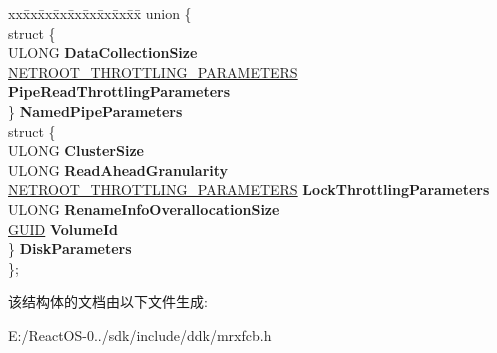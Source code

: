 \begin{DoxyCompactItemize}
\begin{tabbing}
xx\=xx\=xx\=xx\=xx\=xx\=xx\=xx\=xx\=\kill
union \{\\
\>struct \{\\
\>\>ULONG {\bfseries DataCollectionSize}\\
\>\>\hyperlink{struct___n_e_t_r_o_o_t___t_h_r_o_t_t_l_i_n_g___p_a_r_a_m_e_t_e_r_s}{NETROOT\_THROTTLING\_PARAMETERS} {\bfseries PipeReadThrottlingParameters}\\
\>\} {\bfseries NamedPipeParameters}\\
\>struct \{\\
\>\>ULONG {\bfseries ClusterSize}\\
\>\>ULONG {\bfseries ReadAheadGranularity}\\
\>\>\hyperlink{struct___n_e_t_r_o_o_t___t_h_r_o_t_t_l_i_n_g___p_a_r_a_m_e_t_e_r_s}{NETROOT\_THROTTLING\_PARAMETERS} {\bfseries LockThrottlingParameters}\\
\>\>ULONG {\bfseries RenameInfoOverallocationSize}\\
\>\>\hyperlink{interface_g_u_i_d}{GUID} {\bfseries VolumeId}\\
\>\} {\bfseries DiskParameters}\\
\}; \\

\end{tabbing}\end{DoxyCompactItemize}


该结构体的文档由以下文件生成\+:\begin{DoxyCompactItemize}
\item 
E\+:/\+React\+O\+S-\/0../sdk/include/ddk/mrxfcb.\+h\end{DoxyCompactItemize}
